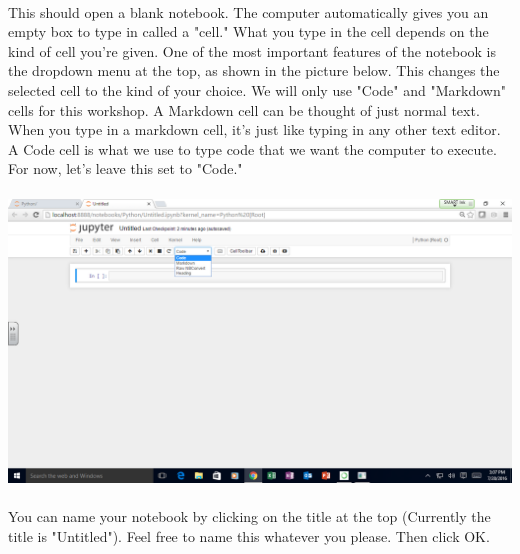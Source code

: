 \documentclass[]{article}
\begin{document}
\paragraph{}
This should open a blank notebook. The computer automatically gives you an empty box to type in called a "cell." What you type in the cell depends on the kind of cell you're given. One of the most important features of the notebook is the dropdown menu at the top, as shown in the picture below. This changes the selected cell to the kind of your choice. We will only use "Code" and "Markdown" cells for this workshop. A Markdown cell can be thought of just normal text. When you type in a markdown cell, it's just like typing in any other text editor. A Code cell is what we use to type code that we want the computer to execute. For now, let's leave this set to "Code."
\paragraph{}
\begin{centering}
    \centerline{\includegraphics[scale=0.35]{Screenshot_21.png}}
\end{centering}

\paragraph{}
You can name your notebook by clicking on the title at the top (Currently the title is "Untitled"). Feel free to name this whatever you please. Then click OK.
\end{document}
